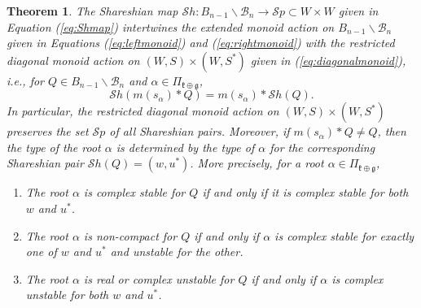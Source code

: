 \documentclass[12pt]{amsart}
\numberwithin{equation}{section}
\newtheorem{thm}{Theorem}[section]
\newcommand{\fk}{\mbox{${\mathfrak k}$}}
\newcommand{\fg}{\mbox{${\mathfrak g}$}}
\newcommand{\B}{\mathcal{B}}
\newcommand{\Borbitspace}{B_{n-1}\backslash\B_{n}}
\newcommand{\Sh}{\mathcal{S}h}
\newcommand{\Sp}{\mathcal{S}p}
\begin{document}
\begin{thm}\label{thm:intertwine}
The Shareshian map $\Sh: \Borbitspace \to \Sp\subset W\times W$ given in Equation (\ref{eq:Shmap})
intertwines the extended monoid action on $\Borbitspace$ given in Equations (\ref{eq:leftmonoid}) and (\ref{eq:rightmonoid}) with the restricted diagonal monoid action on $(W,S)\times (W,S^{*})$ given in (\ref{eq:diagonalmonoid}), i.e., for $Q\in\Borbitspace$ and $\alpha\in\Pi_{\fk \oplus \fg}$,
 \begin{equation}\label{eq:Shinter}
 \Sh(m(s_{\alpha})*Q)=m(s_{\alpha})*\Sh(Q).  
 \end{equation}
In particular, the restricted diagonal monoid action on $(W,S)\times (W, S^{*})$ preserves the set $\Sp$ of all Shareshian pairs.  
Moreover, if $m(s_{\alpha})*Q\neq Q$, then the type of the root $\alpha$ is determined by the type of $\alpha$ for the corresponding Shareshian pair $\Sh(Q)=(w,u^{*})$.  More precisely, for a root $\alpha\in\Pi_{\fk \oplus \fg}$, 
\begin{enumerate}
\item The root $\alpha$ is complex stable for $Q$ if and only if it is complex stable for both $w$ and $u^{*}$.%
\item The root $\alpha$ is non-compact for $Q$ if and only if $\alpha$ is complex stable for exactly one of $w$ and $u^{*}$ and unstable for the other. %
\item The root $\alpha$ is real or complex unstable for $Q$ if and only if $\alpha$ is complex unstable for both $w$ and $u^{*}$.
\end{enumerate}
\end{thm}
\end{document}
